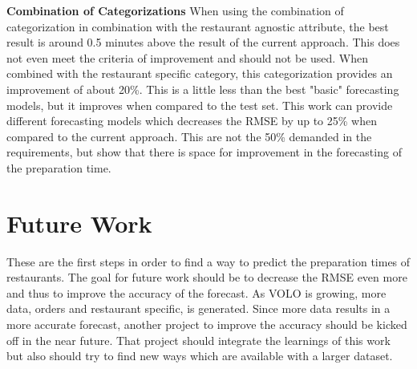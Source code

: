 \newline\textbf{Combination of Categorizations}\newline
When using the combination of categorization in combination with the restaurant agnostic attribute, the best result is around 0.5 minutes above the result of the current approach. This does not even meet the criteria of improvement and should not be used.\newline
When combined with the restaurant specific category, this categorization provides an improvement of about 20\%. This is a little less than the best "basic" forecasting models, but it improves when compared to the test set.
\newline\newline
This work can provide different forecasting models which decreases the RMSE by up to 25\% when compared to the current approach. This are not the 50\% demanded in the requirements, but show that there is space for improvement in the forecasting of the preparation time.
\section{Future Work}
These are the first steps in order to find a way to predict the preparation times of restaurants. The goal for future work should be to decrease the RMSE even more and thus to improve the accuracy of the forecast. As VOLO is growing, more data, orders and restaurant specific, is generated. Since more data results in a more accurate forecast, another project to improve the accuracy should be kicked off in the near future. That project should integrate the learnings of this work but also should try to find new ways which are available with a larger dataset.
